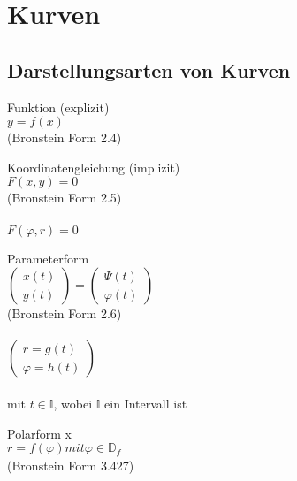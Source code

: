 \section{Kurven}



\subsection{Darstellungsarten von Kurven } %
  \begin{minipage}[t]{3.5cm}
    Funktion (explizit) \\
    $ y = f(x)$ \\
        \tiny{(Bronstein Form 2.4)}
  \end{minipage}
  \begin{minipage}[t]{6cm}    
    Koordinatengleichung (implizit) \\
    $ F(x,y) = 0 $ \\
        {\tiny{(Bronstein Form 2.5)}}\\
        \\
    $ F(\varphi,r) = 0 $ 
  \end{minipage}
  \begin{minipage}[t]{5.5cm}    
    Parameterform \\
    $ \left( \begin{array} {l} x(t) \\ y(t) \end{array} \right) =
          \left( \begin{array} {l} \Psi(t) \\ \varphi(t) \end{array} \right)$\\
        {\tiny{(Bronstein Form 2.6)}}\\
     \\
     $ \left(
     \begin{array}{l} 
	    r = g(t) \\
	    \varphi = h(t)
     \end{array} 
     \right)$\\
     \\
     {\small{mit $t \in \mathbb{I}$, wobei $\mathbb{I}$ ein Intervall ist}}
  \end{minipage} 
  \begin{minipage}[t]{3cm}
      Polarform x\\
      $ r=f(\varphi) mit \varphi \in \mathbb{D}_{\textit{f}} $ \\
        {\tiny{(Bronstein Form 3.427)}}
    \end{minipage}\\

